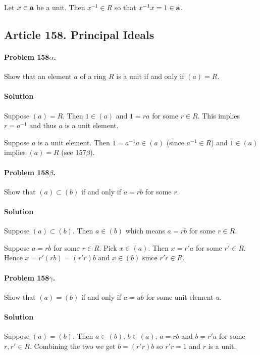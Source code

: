 Let $ x \in \mathsf{\mathbf{a}}$ be a unit. Then $x^{-1} \in R$ so that $ x^{-1} x = 1 \in
\mathsf{\mathbf{a}}$.

\subsection{Article 158. Principal Ideals}

\paragraph{Problem 158$\alpha$.}
Show that an element $a$ of a ring $R$ is a unit if and only if $ (a) = R$.

\paragraph*{Solution}
Suppose $ (a) = R$. Then $ 1 \in (a)$ and $ 1 = ra$ for some $r \in R$. This
implies $ r = a^{-1}$ and thus $a$ is a unit element.

Suppose $ a $ is a unit element. Then $ 1 = a^{-1} a \in (a)$ (since $a^{-1}
\in R$) and $ 1 \in (a)$ implies $(a) = R$ (see 157$\beta$).

\paragraph{Problem 158$\beta$.}
Show that $(a) \subset (b)$ if and only if $a = rb$ for some $r$.

\paragraph*{Solution}
Suppose $(a) \subset (b)$. Then $ a \in (b) $ which means $ a = rb $ for some $
r \in R$.

Suppose $ a = rb $ for some $ r \in R$. Pick $x \in (a)$. Then $ x = r'a $ for
some $ r' \in R$. Hence $x = r'(rb) = (r'r)b $ and $ x \in (b) $ since $r'r \in
R$.

\paragraph{Problem 158$\gamma$.}
Show that $(a) = (b)$ if and only if $a = ub$ for some unit element $u$.

\paragraph*{Solution}
Suppose $(a) = (b)$. Then $a \in (b)$, $b \in (a)$, $a = rb$ and $ b = r'a$ for
some $ r, r' \in R$. Combining the two we get $ b = (r'r)b$ so $r'r = 1$ and $
r $ is a unit.


